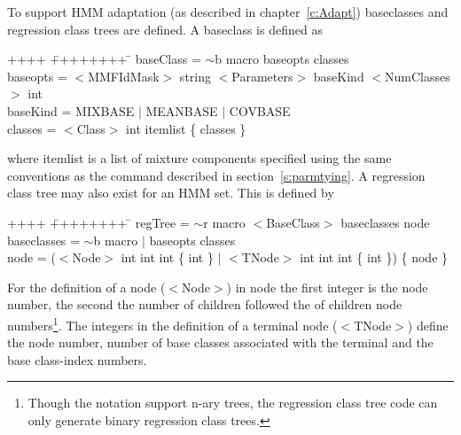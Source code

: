 To support HMM adaptation (as described in
chapter~\ref{c:Adapt}) baseclasses and regression class trees are
defined.  A baseclass is defined as {\sf
\begin{tabbing}
++++ \= ++++++++ \=  \kill
\>   baseClass = \> $\sim$b macro  baseopts classes\\
\>   baseopts  =  \> $<$MMFIdMask$>$ string $<$Parameters$>$ baseKind $<$NumClasses$>$ int\\
\>   baseKind  = \>MIXBASE $|$ MEANBASE $|$ COVBASE \\
\>   classes   = \> $<$Class$>$ int itemlist  \{ classes \} \\
\end{tabbing}
} 
\noindent
where itemlist is a list of mixture components specified using
the same conventions as the  command
described in section~\ref{s:parmtying}.  A regression class tree may
also exist for an HMM set. This is defined by {\sf
\begin{tabbing}
++++ \= ++++++++ \=  \kill
\>   regTree = \> $\sim$r macro $<$BaseClass$>$ baseclasses node \\
\>   baseclasses = \> $\sim$b macro $|$ baseopts classes \\
\>   node    = \> ($<$Node$>$ int int int \{ int \}  $|$ $<$TNode$>$ int int
int \{ int \}) \{ node \}
\end{tabbing}
}
\noindent
For the definition of a node ($<$Node$>$) in {\sf node} the first integer is the 
node number, the second the number of children followed the of children
node numbers\footnote{Though the notation support n-ary trees, the regression
class tree code can only generate binary regression class trees.}. The 
integers in the definition of a terminal node ($<$TNode$>$) define the node number, 
number of base classes associated with the terminal and the base class-index numbers.

